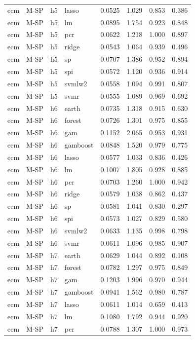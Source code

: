 \begin{ThreePartTable}
\begin{longtable}[t]{llclcccc}
ecm & M-SP & h5 & lasso & 0.0525 & 1.029 & 0.853 & 0.386\\
ecm & M-SP & h5 & lm & 0.0895 & 1.754 & 0.923 & 0.848\\
ecm & M-SP & h5 & pcr & 0.0622 & 1.218 & 1.000 & 0.897\\
ecm & M-SP & h5 & ridge & 0.0543 & 1.064 & 0.939 & 0.496\\
ecm & M-SP & h5 & sp & 0.0707 & 1.386 & 0.952 & 0.894\\
ecm & M-SP & h5 & spi & 0.0572 & 1.120 & 0.936 & 0.914\\
ecm & M-SP & h5 & svmlw2 & 0.0558 & 1.094 & 0.991 & 0.807\\
ecm & M-SP & h5 & svmr & 0.0555 & 1.089 & 0.969 & 0.692\\
\addlinespace
ecm & M-SP & h6 & earth & 0.0735 & 1.318 & 0.915 & 0.630\\
ecm & M-SP & h6 & forest & 0.0726 & 1.301 & 0.975 & 0.855\\
ecm & M-SP & h6 & gam & 0.1152 & 2.065 & 0.953 & 0.931\\
ecm & M-SP & h6 & gamboost & 0.0848 & 1.520 & 0.979 & 0.775\\
ecm & M-SP & h6 & lasso & 0.0577 & 1.033 & 0.836 & 0.426\\
ecm & M-SP & h6 & lm & 0.1007 & 1.805 & 0.928 & 0.885\\
ecm & M-SP & h6 & pcr & 0.0703 & 1.260 & 1.000 & 0.942\\
ecm & M-SP & h6 & ridge & 0.0579 & 1.038 & 0.862 & 0.437\\
ecm & M-SP & h6 & sp & 0.0581 & 1.041 & 0.830 & 0.297\\
ecm & M-SP & h6 & spi & 0.0573 & 1.027 & 0.829 & 0.580\\
ecm & M-SP & h6 & svmlw2 & 0.0633 & 1.135 & 0.998 & 0.798\\
ecm & M-SP & h6 & svmr & 0.0611 & 1.096 & 0.985 & 0.907\\
\addlinespace
ecm & M-SP & h7 & earth & 0.0629 & 1.044 & 0.892 & 0.108\\
ecm & M-SP & h7 & forest & 0.0782 & 1.297 & 0.975 & 0.849\\
ecm & M-SP & h7 & gam & 0.1203 & 1.996 & 0.970 & 0.944\\
ecm & M-SP & h7 & gamboost & 0.0941 & 1.562 & 0.980 & 0.787\\
ecm & M-SP & h7 & lasso & 0.0611 & 1.014 & 0.659 & 0.413\\
ecm & M-SP & h7 & lm & 0.1080 & 1.792 & 0.944 & 0.920\\
ecm & M-SP & h7 & pcr & 0.0788 & 1.307 & 1.000 & 0.973\\

\end{longtable}
\end{ThreePartTable}
